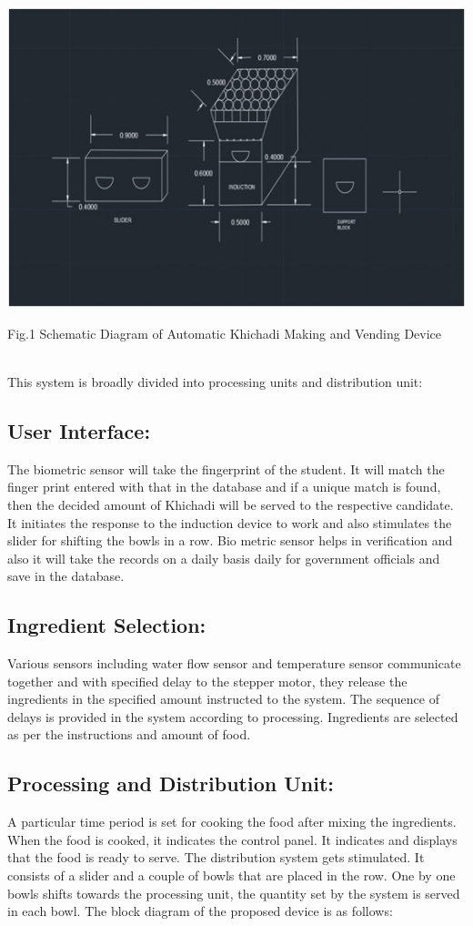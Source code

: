 \documentclass{article}
\begin{document}
\begin{center}\includegraphics[scale=0.6]{schematic}\end{center}
\begin{center}Fig.1 Schematic Diagram of Automatic Khichadi Making and Vending Device\end{center}\\
This system is broadly divided into processing units and distribution unit:\\
\subsection{User Interface:}
The biometric sensor will take the fingerprint of the student. It will match the finger print
entered with that in the database and if a unique match is found, then the decided amount of Khichadi will be
served to the respective candidate. It initiates the response to the induction device to work and also
stimulates the slider for shifting the bowls in a row. Bio metric sensor helps in verification and also it will
take the records on a daily basis daily for government officials and save in the database.
\subsection{Ingredient Selection:}
Various sensors including water flow sensor and temperature sensor communicate
together and with specified delay to the stepper motor, they release the ingredients in the specified amount
instructed to the system. The sequence of delays is provided in the system according to processing.
Ingredients are selected as per the instructions and amount of food.
\subsection{Processing and Distribution Unit:}
A particular time period is set for cooking the food after mixing the
ingredients. When the food is cooked, it indicates the control panel. It indicates and displays that the food is
ready to serve. The distribution system gets stimulated. It consists of a slider and a couple of bowls that are
placed in the row. One by one bowls shifts towards the processing unit, the quantity set by the system is
served in each bowl. The block diagram of the proposed device is as follows:
\end{document}
